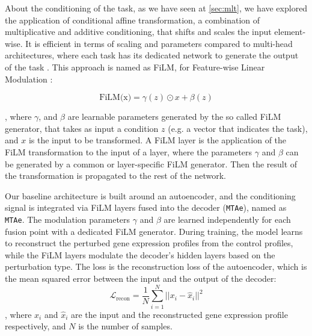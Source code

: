\documentclass[12pt, a4paper]{article}
\begin{document}
About the conditioning of the task, as we have seen at \cref{sec:mlt}, we have explored the application of conditional affine transformation, a combination of multiplicative and additive conditioning, that shifts and scales the input element-wise. It is efficient in terms of scaling and parameters compared to multi-head architectures, where each task has its dedicated network to generate the output of the task . This approach is named as FiLM, for Feature-wise Linear Modulation \cite{dumoulin2018feature-wise, perez2018film}:

\[ \text{FiLM(x)} = \gamma (z) \odot x + \beta (z) \]

, where $\gamma$, and $\beta$ are learnable parameters generated by the so called FiLM generator, that takes as input a condition $z$ (e.g. a vector that indicates the task), and $x$ is the input to be transformed. 
A FiLM layer is the application of the FiLM transformation to the input of a layer, where the parameters $\gamma$ and $\beta$ can be generated by a common or layer-specific FiLM generator.   Then the result of the transformation is propagated to the rest of the network.





Our baseline architecture is built around an autoencoder, and the conditioning signal is integrated via FiLM layers fused into the decoder (\verb|MTAe|), named as \verb|MTAe|. The modulation parameters $\gamma$ and $\beta$ are learned independently for each fusion point with a dedicated FiLM generator.
During training, the model learns to reconstruct the perturbed gene expression profiles from the control profiles, while the FiLM layers modulate the decoder's hidden layers based on the perturbation type.
The loss is the reconstruction loss of the autoencoder, which is the mean squared error between the input and the output of the decoder:
\[
\mathcal{L}_{\text{recon}} = \frac{1}{N} \sum_{i=1}^{N} ||x_i - \hat{x}_i||^2 \]
, where $x_i$ and $\hat{x}_i$ are the input and the reconstructed gene expression profile respectively, and $N$ is the number of samples.
\end{document}
